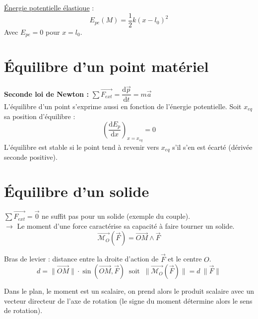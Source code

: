 \documentclass[13pt, twoside, a4paper, french]{report}
\begin{document}
        \underline{Énergie potentielle élastique} : \[\displaystyle E_{pe}(M) = \dfrac{1}{2} k (x - l_0)^2\]
        Avec $E_{pe} = 0$ pour $x = l_0$.
    
    
    \section{Équilibre d'un point matériel}\label{sec:equilibre-d'un-point-materiel}
        
        \textbf{Seconde loi de Newton : } $\sum \overrightarrow{F_{ext}} = \dfrac{\textrm{d}\vec{p}}{\textrm{d}t} = m \vec{a}$\\
        L'équilibre d'un point s'exprime aussi en fonction de l'énergie potentielle.
        Soit $x_{eq}$ sa position d'équilibre :
        \[ \left( \dfrac{\textrm{d}E_p}{\textrm{d}x}\right) _{x=x_{eq}} = 0\]
        L'équilibre est stable si le point tend à revenir vers $x_{eq}$ s'il s'en est écarté (dérivée seconde positive).
    
    
    \section{Équilibre d'un solide}\label{sec:equilibre-d-un-solide}
        
        $\sum \overrightarrow{F_{ext}} = \vec{0}$ ne suffit pas pour un solide (exemple du couple).\\
        $\rightarrow$ Le moment d'une force caractérise sa capacité à faire tourner un solide.
        \[ \overrightarrow{\mathcal{M}_O}(\overrightarrow{F}) = \overrightarrow{OM} \land \overrightarrow{F} \]
        
        Bras de levier : distance entre la droite d'action de $\overrightarrow{F}$ et le centre $O$.
        \[ d = \|\overrightarrow{OM}\| \cdot \sin(\overrightarrow{OM}, \overrightarrow{F}) \;\; \text{soit} \;\; \|\overrightarrow{\mathcal{M}_O}(\overrightarrow{F})\| = d\ \|\overrightarrow{F}\| \]
        
        Dans le plan, le moment est un scalaire, on prend alors le produit scalaire avec un vecteur directeur de l'axe de rotation (le signe du moment détermine alors le sens de rotation).\\
        
\end{document}
